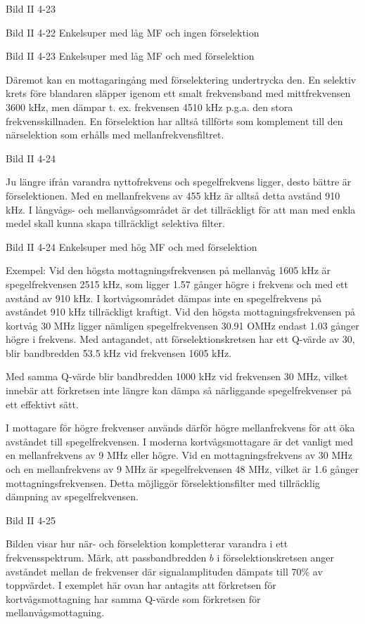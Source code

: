Bild II 4-23

Bild II 4-22 Enkelsuper med låg MF och ingen förselektion

Bild II 4-23 Enkelsuper med låg MF och med förselektion

Däremot kan en mottagaringång med förselektering undertrycka den. En
selektiv krets före blandaren släpper igenom ett smalt frekvensband
med mittfrekvensen 3600 kHz, men dämpar t. ex. frekvensen 4510 kHz
p.g.a. den stora frekvensskillnaden. En förselektion har alltså
tillförts som komplement till den närselektion som erhålls med
mellanfrekvensfiltret.

Bild II 4-24

Ju längre ifrån varandra nyttofrekvens och spegelfrekvens ligger,
desto bättre är förselektionen. Med en mellanfrekvens av 455 kHz är
alltså detta avstånd 910 kHz. I långvågs- och mellanvågsområdet är det
tillräckligt för att man med enkla medel skall kunna skapa
tillräckligt selektiva filter.

Bild II 4-24 Enkelsuper med hög MF och med förselektion

Exempel: Vid den högsta mottagningsfrekvensen på mellanvåg 1605 kHz är
spegelfrekvensen 2515 kHz, som ligger 1.57 gånger högre i frekvens och
med ett avstånd av 910 kHz. I kortvågsområdet dämpas inte en
spegelfrekvens på avståndet 910 kHz tillräckligt kraftigt. Vid den
högsta mottagningsfrekvensen på kortvåg 30 MHz ligger nämligen
spegelfrekvensen 30.91 OMHz endast 1.03 gånger högre i frekvens. Med
antagandet, att förselektionskretsen har ett Q-värde av 30, blir
bandbredden 53.5 kHz vid frekvensen 1605 kHz.

Med samma Q-värde blir bandbredden 1000 kHz vid frekvensen 30 MHz,
vilket innebär att förkretsen inte längre kan dämpa så närliggande
spegelfrekvenser på ett effektivt sätt.

I mottagare för högre frekvenser används därför högre mellanfrekvens
för att öka avståndet till spegelfrekvensen. I moderna
kortvågsmottagare är det vanligt med en mellanfrekvens av 9 MHz eller
högre. Vid en mottagningsfrekvens av 30 MHz och en mellanfrekvens av 9
MHz är spegelfrekvensen 48 MHz, vilket är 1.6 gånger
mottagningsfrekvensen. Detta möjliggör förselektionsfilter med
tillräcklig dämpning av spegelfrekvensen.

Bild II 4-25

Bilden visar hur när- och förselektion kompletterar varandra i ett
frekvensspektrum.  Märk, att passbandbredden \(b\) i
förselektionskretsen anger avståndet mellan de frekvenser där
signalamplituden dämpats till 70\% av toppvärdet. I exemplet här ovan
har antagits att förkretsen för kortvågsmottagning har samma Q-värde
som förkretsen för mellanvågsmottagning.

